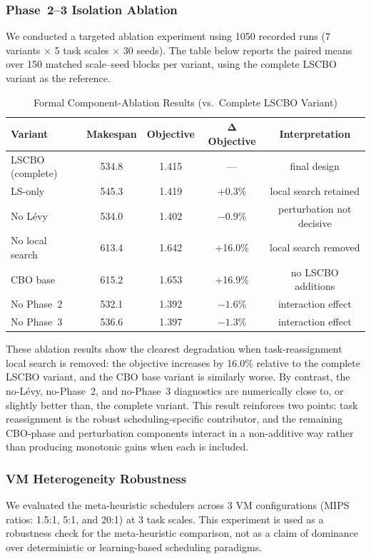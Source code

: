 \documentclass[pdflatex,onecolumn,sn-mathphys-num]{sn-jnl}
\begin{document}
\subsubsection{Phase~2--3 Isolation Ablation}\label{sec:phase_ablation}
We conducted a targeted ablation experiment using 1050 recorded runs (7 variants $\times$ 5 task scales $\times$ 30 seeds). The table below reports the paired means over 150 matched scale--seed blocks per variant, using the complete LSCBO variant as the reference.

\begin{table}[ht]
\centering
\caption{Formal Component-Ablation Results (vs.\ Complete LSCBO Variant)}\label{tab:phase_ablation}
\begin{tabular}{l c c c c}
\toprule
\textbf{Variant} & \textbf{Makespan} & \textbf{Objective} & $\boldsymbol{\Delta}$ \textbf{Objective} & \textbf{Interpretation} \\
\midrule
LSCBO (complete) & 534.8 & 1.415 & --- & final design \\
LS-only & 545.3 & 1.419 & +0.3\% & local search retained \\
No L\'{e}vy & 534.0 & 1.402 & $-0.9\%$ & perturbation not decisive \\
No local search & 613.4 & 1.642 & +16.0\% & local search removed \\
CBO base & 615.2 & 1.653 & +16.9\% & no LSCBO additions \\
No Phase~2 & 532.1 & 1.392 & $-1.6\%$ & interaction effect \\
No Phase~3 & 536.6 & 1.397 & $-1.3\%$ & interaction effect \\
\bottomrule
\end{tabular}
\end{table}

These ablation results show the clearest degradation when task-reassignment local search is removed: the objective increases by 16.0\% relative to the complete LSCBO variant, and the CBO base variant is similarly worse. By contrast, the no-L\'{e}vy, no-Phase~2, and no-Phase~3 diagnostics are numerically close to, or slightly better than, the complete variant. This result reinforces two points: task reassignment is the robust scheduling-specific contributor, and the remaining CBO-phase and perturbation components interact in a non-additive way rather than producing monotonic gains when each is included.

\subsubsection{VM Heterogeneity Robustness}\label{sec:vm_heterogeneity}
We evaluated the meta-heuristic schedulers across 3 VM configurations (MIPS ratios: 1.5:1, 5:1, and 20:1) at 3 task scales. This experiment is used as a robustness check for the meta-heuristic comparison, not as a claim of dominance over deterministic or learning-based scheduling paradigms.
\end{document}
